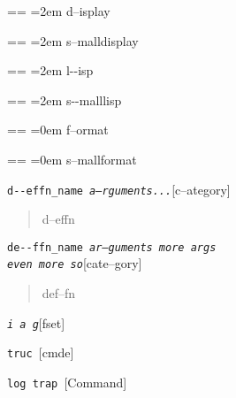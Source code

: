 \documentclass{book}
\makeatletter
\newcommand\GNUTexinfocommandstyletextvar[1]{{\normalfont{}\textsl{#1}}}%
\newenvironment{GNUTexinfopreformatted}{%
  \par\obeylines\obeyspaces\frenchspacing
  \parskip=\z@\parindent=\z@}{}
\makeatother
\begin{document}
\begin{titlepage}
\begin{GNUTexinfopreformatted}
\leftskip=2em\relax%
d--isplay
\end{GNUTexinfopreformatted}

\begin{GNUTexinfopreformatted}
\leftskip=2em\relax\footnotesize%
s--malldisplay
\end{GNUTexinfopreformatted}

\begin{GNUTexinfopreformatted}
\leftskip=2em\relax\ttfamily%
l{-}{-}isp
\end{GNUTexinfopreformatted}

\begin{GNUTexinfopreformatted}
\leftskip=2em\relax\ttfamily\footnotesize%
s{-}{-}malllisp
\end{GNUTexinfopreformatted}

\begin{GNUTexinfopreformatted}
\leftskip=0em\relax%
f--ormat
\end{GNUTexinfopreformatted}

\begin{GNUTexinfopreformatted}
\leftskip=0em\relax\footnotesize%
s--mallformat
\end{GNUTexinfopreformatted}

\noindent\texttt{d{-}{-}effn\_name \EmbracOn{}\textnormal{\textsl{a--rguments...}}\EmbracOff{}}\hfill[c--ategory]

%
\begin{quote}
\unskip{\parskip=0pt\noindent}%
d--effn
\end{quote}

\noindent\texttt{de{-}{-}ffn\_name \EmbracOn{}\textnormal{\textsl{ar--guments    more args \leavevmode{}\\ even more so}}\EmbracOff{}}\hfill[cate--gory]

%
\begin{quote}
\unskip{\parskip=0pt\noindent}%
def--fn
\end{quote}

\noindent\texttt{\GNUTexinfocommandstyletextvar{i} \EmbracOn{}\textnormal{\textsl{a g}}\EmbracOff{}}\hfill[fset]

\index[fn]{i@\texttt{\GNUTexinfocommandstyletextvar{i}}}%
%
\noindent\texttt{truc \EmbracOn{}\textnormal{\textsl{}}\EmbracOff{}}\hfill[cmde]

%
\noindent\texttt{log trap \EmbracOn{}\textnormal{\textsl{}}\EmbracOff{}}\hfill[Command]


\end{titlepage}
\end{document}
